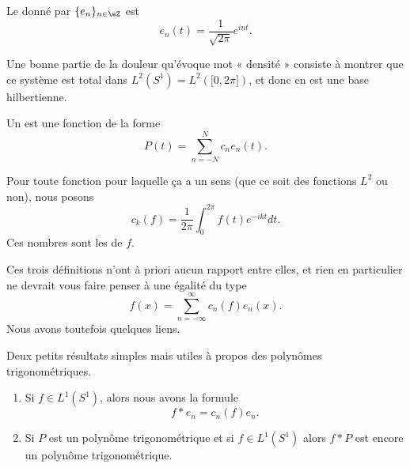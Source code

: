 \begin{definition}      \label{DEFooGCZAooFecAHB}
	Le  donné par \( \{ e_n \}_{n\in \eZ}\) est
	\begin{equation}
		e_n(t)= \frac{1}{ \sqrt{ 2\pi } } e^{int}.
	\end{equation}
\end{definition}

Une bonne partie de la douleur qu'évoque mot « densité » consiste à montrer que ce système est total dans \( L^2(S^1)=L^2(\mathopen[ 0 , 2\pi \mathclose])\), et donc en est une base hilbertienne.

\begin{definition}
	Un  est une fonction de la forme
	\begin{equation}
		P(t)=\sum_{n=-N}^Nc_n e_n(t).
	\end{equation}
\end{definition}

\begin{definition}     \label{DEFooZDUKooRnYhhF}
	Pour toute fonction pour laquelle ça a un sens (que ce soit des fonctions \( L^2\) ou non), nous posons
	\begin{equation}\label{EqhIPoPH}
		c_k(f)=\frac{1}{ 2\pi }\int_{0}^{2\pi}f(t) e^{-ikt}dt.
	\end{equation}
	Ces nombres sont les  de \( f\).
\end{definition}

Ces trois définitions n'ont à priori aucun rapport entre elles, et rien en particulier ne devrait vous faire penser à une égalité du type
\begin{equation}
	f(x)=\sum_{n=-\infty}^{\infty}c_n(f)e_n(x).
\end{equation}
Nous avons toutefois quelques liens.

\begin{lemma}   \label{LemZVfZlms}
	Deux petits résultats simples mais utiles à propos des polynômes trigonométriques.
	\begin{enumerate}
		\item
		      Si \( f\in L^1(S^1)\), alors nous avons la formule
		      \begin{equation}
			      f*e_n=c_n(f)e_n.
		      \end{equation}
		\item

		      Si \( P\) est un polynôme trigonométrique et si \( f\in L^1(S^1)\) alors \( f*P\) est encore un polynôme trigonométrique.
	\end{enumerate}
\end{lemma}


